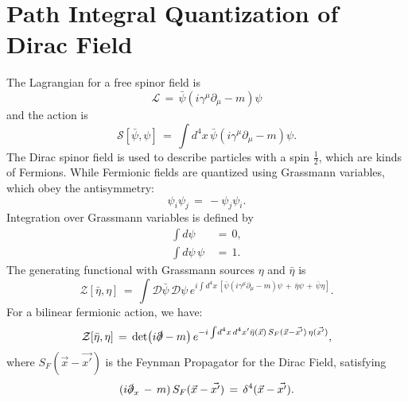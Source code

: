 \documentclass[11pt]{article}
\numberwithin{equation}{section}
\begin{document}
\section{Path Integral Quantization of Dirac Field}
The Lagrangian for a free spinor field is
\begin{equation}
    \mathcal{L}\,=\,\bar\psi(i\gamma^\mu\partial_\mu-m)\psi
\end{equation}
and the action is
\begin{equation}
    \mathcal{S}[\bar\psi,\psi]\,=\,\int\!d^4x\,\bar\psi(i\gamma^\mu\partial_\mu-m)\psi.
\end{equation}
The Dirac spinor field is used to describe particles with a spin $\frac{1}{2}$, which are kinds of Fermions. While Fermionic fields are quantized using Grassmann variables, which obey the antisymmetry:
\begin{equation}
    \psi_i\psi_j\,=\,-\psi_j\psi_i.
\end{equation}
Integration over Grassmann variables is defined by
\begin{equation}
    \begin{split}
        \int\!d\psi\,&=\,0,\\ \int\!d\psi\,\psi\,&=\,1.
    \end{split}
\end{equation}
The generating functional with Grassmann sources $\eta$ and $\bar\eta$ is
\begin{equation}
    \mathcal{Z}[\bar\eta,\eta]\,=\,\int\!\mathcal{D}\bar\psi\,\mathcal{D}\psi\,e^{i\int\!d^4x\,[\bar\psi(i\gamma^\mu\partial_\mu-m)\psi\,+\,\bar\eta\psi\,+\,\bar\psi\eta]}.
\end{equation}
For a bilinear fermionic action, we have:
\begin{equation}
    \mathcal{Z}[\bar\eta,\eta]\,=\,\det(i\slashed{\partial}-m)\,e^{-i\int\!d^4x\,d^4x'\bar\eta(\Vec{x})\,S_F(\Vec{x}-\Vec{x'})\,\eta(\Vec{x'})},
\end{equation}
where $S_F(\Vec{x}-\Vec{x'})$ is the Feynman Propagator for the Dirac Field, satisfying
\begin{equation}
    (i\slashed{\partial}_x\,-\,m)\,S_F(\Vec{x}-\Vec{x'})\,=\,\delta^4(\Vec{x}-\Vec{x'}).
\end{equation}
\end{document}
